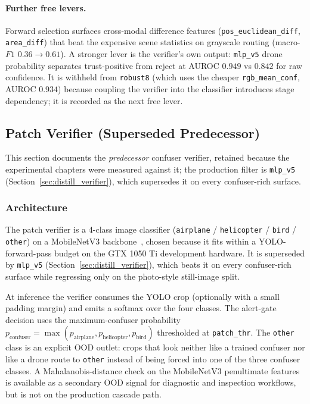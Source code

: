 \paragraph{Further free levers.}
Forward selection surfaces cross-modal difference features (\texttt{pos\_euclidean\_diff}, \texttt{area\_diff}) that beat the expensive scene statistics on grayscale routing (macro-$F1$ $0.36 \to 0.61$). A stronger lever is the verifier's own output: \texttt{mlp\_v5} drone probability separates trust-positive from reject at AUROC $0.949$ vs $0.842$ for raw confidence. It is withheld from \texttt{robust8} (which uses the cheaper \texttt{rgb\_mean\_conf}, AUROC $0.934$) because coupling the verifier into the classifier introduces stage dependency; it is recorded as the next free lever.

\subsection{Patch Verifier (Superseded Predecessor)}
\label{sec:patch_verifier_arch}

This section documents the \emph{predecessor} confuser verifier, retained because the experimental chapters were measured against it; the production filter is \texttt{mlp\_v5} (Section~\ref{sec:distill_verifier}), which supersedes it on every confuser-rich surface.

\subsubsection{Architecture}

The patch verifier is a 4-class image classifier (\texttt{airplane} / \texttt{helicopter} / \texttt{bird} / \texttt{other}) on a MobileNetV3 backbone~\cite{howard2019mobilenetv3}, chosen because it fits within a YOLO-forward-pass budget on the GTX 1050 Ti development hardware. It is superseded by \texttt{mlp\_v5} (Section~\ref{sec:distill_verifier}), which beats it on every confuser-rich surface while regressing only on the photo-style still-image split.

At inference the verifier consumes the YOLO crop (optionally with a small padding margin) and emits a softmax over the four classes. The alert-gate decision uses the maximum-confuser probability $p_\text{confuser} = \max(p_\text{airplane}, p_\text{helicopter}, p_\text{bird})$ thresholded at \texttt{patch\_thr}. The \texttt{other} class is an explicit OOD outlet: crops that look neither like a trained confuser nor like a drone route to \texttt{other} instead of being forced into one of the three confuser classes. A Mahalanobis-distance check on the MobileNetV3 penultimate features is available as a secondary OOD signal for diagnostic and inspection workflows, but is not on the production cascade path.

